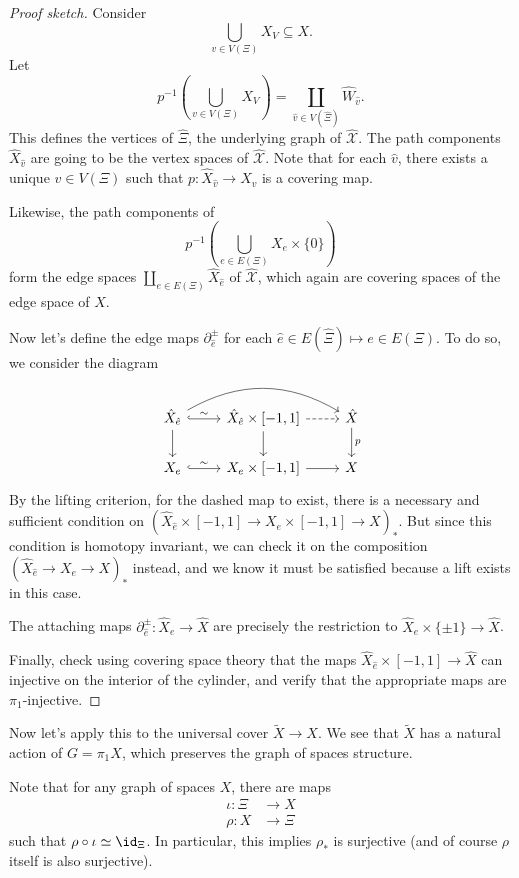 \documentclass[a4paper]{article}
\begin{document}
\begin{proof}[Proof sketch]
  Consider
  \[
    \bigcup_{v \in V(\Xi)} X_V \subseteq X.
  \]
  Let
  \[
    p^{-1}\left(\bigcup_{v \in V(\Xi)} X_V\right) = \coprod_{\hat{v} \in V(\hat{\Xi})} \hat{W}_{\hat{v}}.
  \]
  This defines the vertices of $\hat{\Xi}$, the underlying graph of $\hat{\mathcal{X}}$. The path components $\hat{X}_{\hat{v}}$ are going to be the vertex spaces of $\hat{\mathcal{X}}$. Note that for each $\hat{v}$, there exists a unique $v \in V(\Xi)$ such that $p: \hat{X}_{\hat{v}} \to X_v$ is a covering map.

  Likewise, the path components of
  \[
    p^{-1}\left(\bigcup_{e \in E(\Xi)} X_e \times \{0\}\right)
  \]
  form the edge spaces $\coprod_{e \in E(\Xi)} \hat{X}_{\hat{e}}$ of $\hat{\mathcal{X}}$, which again are covering spaces of the edge space of $X$.

  Now let's define the edge maps $\partial_{\hat{e}}^{\pm}$ for each $\hat{e} \in E(\hat{\Xi}) \mapsto e \in E(\Xi)$. To do so, we consider the diagram
  \[
    \begin{tikzcd}
      \hat{X}_{\hat{e}} \ar[r, hook, "\sim"] \ar[rr, bend left] \ar[d] & \hat{X}_{\hat{e}} \times [-1, 1]  \ar[d] \ar[r, dashed] & \hat{X} \ar[d, "p"]\\
      X_e \ar[r, hook, "\sim"] & X_e \times [-1, 1] \ar[r] & X
    \end{tikzcd}
  \]
  By the lifting criterion, for the dashed map to exist, there is a necessary and sufficient condition on $(\hat{X}_{\hat{e}} \times [-1, 1] \to X_e \times [-1, 1] \to X)_*$. But since this condition is homotopy invariant, we can check it on the composition $(\hat{X}_{\hat{e}} \to X_e \to X)_*$ instead, and we know it must be satisfied because a lift exists in this case.

  The attaching maps $\partial^{\pm}_{\hat{e}}: \hat{X}_e \to \hat{X}$ are precisely the restriction to $\hat{X}_e \times \{\pm 1\} \to \hat{X}$.

  Finally, check using covering space theory that the maps $\hat{X}_{\hat{e}} \times [-1, 1] \to \hat{X}$ can injective on the interior of the cylinder, and verify that the appropriate maps are $\pi_1$-injective.
\end{proof}

Now let's apply this to the universal cover $\tilde{X} \to X$. We see that $\tilde{X}$ has a natural action of $G = \pi_1X$, which preserves the graph of spaces structure.

Note that for any graph of spaces $X$, there are maps
\begin{align*}
  \iota: \Xi &\to X\\
  \rho: X &\to \Xi
\end{align*}
such that $\rho \circ \iota \simeq \id_{\Xi}$. In particular, this implies $\rho_*$ is surjective (and of course $\rho$ itself is also surjective).
\end{document}
